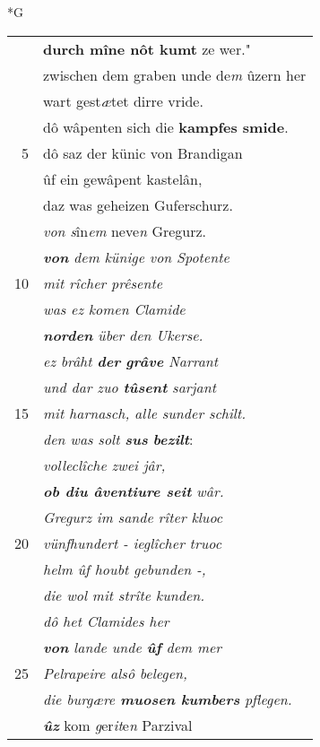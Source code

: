 \documentclass[8pt,a4paper,notitlepage]{article}
\begin{document}
\begin{table}[ht]
\begin{minipage}[t]{0.5\linewidth}
\small
\begin{center}*G
\end{center}
\begin{tabular}{rl}
 & \textbf{durch mîne nôt kumt} ze wer."\\ 
 & zwischen dem graben unde de\textit{m} ûzern her\\ 
 & wart gest\textit{æ}tet dirre vride.\\ 
 & dô wâpenten sich die \textbf{kampfes smide}.\\ 
5 & dô saz der künic von Brandigan\\ 
 & ûf ein gewâpent kastelân,\\ 
 & daz was geheizen Guferschurz.\\ 
 & \textit{von s}în\textit{em} neve\textit{n} Gregurz.\\ 
 & \textit{\textbf{von} dem künige von Spotente}\\ 
10 & \textit{mit rîcher prêsente}\\ 
 & \textit{was ez komen Clamide}\\ 
 & \textit{\textbf{norden} über den Ukerse.}\\ 
 & \textit{ez brâht \textbf{der} \textbf{grâve} Narrant}\\ 
 & \textit{und dar zuo \textbf{tûsent} sarjant}\\ 
15 & \textit{mit harnasch, alle sunder schilt.}\\ 
 & \textit{den was solt \textbf{sus} \textbf{bezilt}}:\\ 
 & \textit{volleclîche zwei jâr,}\\ 
 & \textit{\textbf{ob diu âventiure seit} wâr.}\\ 
 & \textit{Gregurz im sande rîter kluoc}\\ 
20 & \textit{vünfhundert - ieglîcher truoc}\\ 
 & \textit{helm ûf houbt gebunden -,}\\ 
 & \textit{die wol mit strîte kunden.}\\ 
 & \textit{dô het Clamides her}\\ 
 & \textit{\textbf{von} lande unde \textbf{ûf} dem mer}\\ 
25 & \textit{Pelrapeire alsô belegen,}\\ 
 & \textit{die burgære \textbf{muosen kumbers} pflegen.}\\ 
 & \textit{\textbf{ûz}} kom \textit{g}er\textit{it}e\textit{n} Parzival\\ 

\end{tabular}
\end{minipage}
\end{table}
\end{document}
